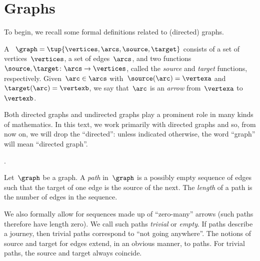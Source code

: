 
\section{Graphs}

To begin, we recall some formal definitions related to (directed) graphs.

\begin{definition}[Graph]
	\label{def:Graph}
	A \emph{}~$\graph=\tup{\vertices,\arcs, \source,\target}$ consists of a set of vertices~$\vertices$, a set of edges~$\arcs$, and two functions~$\source,\target \colon \arcs \to \vertices$, called the \emph{source} and \emph{target} functions, respectively.
	Given~$\arc\in \arcs$ with~$\source(\arc)=\vertexa$ and~$\target(\arc)=\vertexb$, we say that~$\arc$ is an \emph{arrow} from~$\vertexa$ to~$\vertexb$.
\end{definition}

\begin{remark}
	Both directed graphs and undirected graphs play a prominent role in many kinds of mathematics.
	In this text, we work primarily with directed graphs and so, from now on, we will drop the ``directed'': unless indicated otherwise, the word ``graph'' will mean ``directed graph''.
\end{remark}
.
\begin{definition}[Paths]
	\label{def:path}
	Let~$\graph$ be a graph.
	A \emph{path} in~$\graph$ is a possibly empty sequence of edges such that the target of one edge is the source of the next.
	The \emph{length} of a path is the number of edges in the sequence.
\end{definition}
We also formally allow for sequences made up of ``zero-many'' arrows (such paths therefore have length zero).
We call such paths \emph{trivial} or \emph{empty}.
If paths describe a journey, then trivial paths correspond to ``not going anywhere''.
The notions of source and target for edges extend, in an obvious manner, to paths.
For trivial paths, the source and target always coincide.
